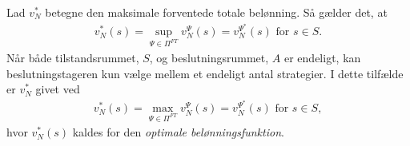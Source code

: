 Lad $v_N^*$ betegne den maksimale forventede totale belønning. Så gælder det, at
%
\begin{align}\label{eq:v_N=sup}
    v_N^*(s)=\sup_{\Psi\in \Pi^{FT}} v_N^{\Psi}(s)=v_N^{\Psi^*}(s) \text{ for }  s\in S.
\end{align}
Når både tilstandsrummet, $S$, og beslutningsrummet, $A$ er endeligt, kan beslutningstageren kun vælge mellem et endeligt antal strategier. I dette tilfælde er $v_N^*$ givet ved
\begin{align*}
    v_N^*(s)=\max_{\Psi\in \Pi^{FT}} v_N^{\Psi}(s)=v_N^{\Psi^*}(s) \text{ for }  s\in S,
\end{align*}
hvor $v_N^*(s)$ kaldes for den \textit{optimale belønningsfunktion}.









